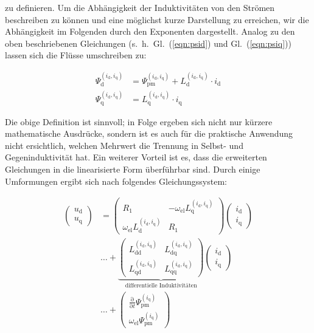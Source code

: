 \documentclass[conference,twocolumn]{IEEEtran}
\newcommand{\x}[1]{\mathrm{#1}}
\begin{document}
zu definieren.
Um die Abhängigkeit der Induktivitäten von den Strömen beschreiben zu können und eine möglichst kurze Darstellung zu erreichen, wir die Abhängigkeit im Folgenden durch den Exponenten dargestellt.
Analog zu den oben beschriebenen Gleichungen (s.~h.~Gl.~(\ref{eqn:psid}) und Gl.~(\ref{eqn:psiq})) lassen sich die Flüsse umschreiben zu:

\begin{align}
\Psi_\x{d}^{(i_\x{d},i_\x{q})} &= \Psi_\x{pm}^{(i_\x{d},i_\x{q})} + L_\x{d}^{(i_\x{d},i_\x{q})}\cdot i_\x{d} \\
\Psi_\x{q}^{(i_\x{d},i_\x{q})} &= L_\x{q}^{(i_\x{d},i_\x{q})}\cdot i_\x{q}
\end{align}

Die obige Definition ist sinnvoll; in Folge ergeben sich nicht nur kürzere mathematische Ausdrücke, sondern ist es auch für die praktische Anwendung nicht ersichtlich, welchen Mehrwert die Trennung in Selbst- und Gegeninduktivität hat.
Ein weiterer Vorteil ist es, dass die erweiterten Gleichungen in die linearisierte Form überführbar sind.
Durch einige Umformungen ergibt sich nach \textcite{Kellner2012} folgendes Gleichungssystem:

\begin{align}
\left( \begin{array}{c} u_\x{d} \\ u_\x{q} \end{array} \right) &= \left( \begin{array}{cc} R_\x{1} & -\omega_\x{el}L_\x{q}^{(i_\x{d},i_\x{q})} \\ \omega_\x{el}L_\x{d}^{(i_\x{d},i_\x{q})} & R_\x{1} \end{array} \right) \left(\begin{array}{c} i_\x{d} \\ i_\x{q} \end{array}\right) \label{eqn:allg-spannungsgleichung} \\ 
 &\ldots + \underbrace{\left( \begin{array}{cc} L_\x{dd}^{(i_\x{d},i_\x{q})} & L_\x{dq}^{(i_\x{d},i_\x{q})} \\ L_\x{qd}^{(i_\x{d},i_\x{q})} & L_\x{qq}^{(i_\x{d},i_\x{q})} \end{array}\right)}_{\text{differentielle Induktivitäten}} \left(\begin{array}{c} i_\x{d} \\ i_\x{q} \end{array} \right) \nonumber \\ 
& \ldots + \left( \begin{array}{c} \frac{\x{\partial}}{\x{\partial }t} \Psi_\x{pm}^{(i_\x{q})} \\ \omega_\x{el} \Psi_\x{pm}^{(i_\x{q})} \nonumber \end{array}  \right) \nonumber
\end{align}
\end{document}
